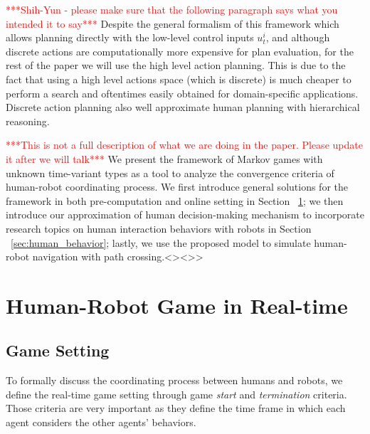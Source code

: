 \documentclass[letterpaper, 10 pt, conference]{ieeeconf}  %
\begin{document}
\textcolor{red}{***Shih-Yun - please make sure that the following paragraph says what you intended it to say***} Despite the general formalism of this framework which allows planning directly 
with the low-level control inputs $u^i_t$, and although discrete actions are computationally more expensive for plan evaluation, for the rest of the paper we will use the high level action planning. This is due to the fact that using a high level actions space (which is discrete) is much cheaper to perform a search and oftentimes easily obtained for domain-specific applications. Discrete action planning also well approximate human planning with hierarchical reasoning.  

\textcolor{red}{***This is not a full description of what we are doing in the paper. Please update it after we will talk***} We present the framework of Markov games with unknown time-variant types as a tool to analyze the convergence criteria of human-robot coordinating process. We first introduce general solutions for the framework in both pre-computation and online setting in Section ~\ref{sec:realtime_game}; we then introduce our approximation of human decision-making mechanism to incorporate research topics on human interaction behaviors with robots in Section ~\ref{sec:human_behavior}; lastly, we use the proposed model to simulate human-robot navigation with path crossing.<><>>

\vspace{-.3em}
\section{Human-Robot Game in Real-time}\label{sec:realtime_game}
\vspace{-.2em}
\subsection{Game Setting}
To formally discuss the coordinating process between humans and robots, we 
define the real-time game setting through game \textit{start} and \textit{termination} criteria. Those criteria are very important as they define the time frame in which each agent considers the other agents' behaviors.
\end{document}
